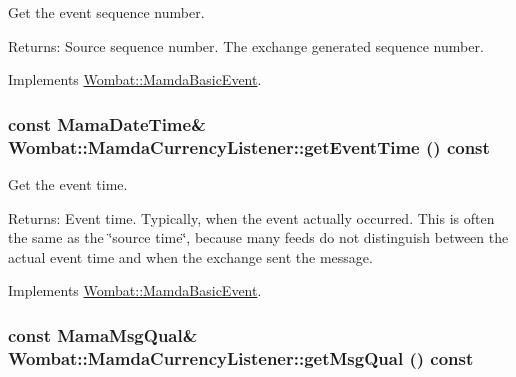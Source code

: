 Get the event sequence number. 

\begin{Desc}
\item[Returns:]Source sequence number. The exchange generated sequence number. \end{Desc}


Implements \hyperlink{classWombat_1_1MamdaBasicEvent_1fd845d48e95b4ee3beafc72d1ac2adf}{Wombat::Mamda\-Basic\-Event}.\hypertarget{classWombat_1_1MamdaCurrencyListener_f50eaef7c50bd1b1e58f0d38967d2b1c}{
\subsubsection[getEventTime]{\setlength{\rightskip}{0pt plus 5cm}const Mama\-Date\-Time\& Wombat::Mamda\-Currency\-Listener::get\-Event\-Time () const}}
\label{classWombat_1_1MamdaCurrencyListener_f50eaef7c50bd1b1e58f0d38967d2b1c}


Get the event time. 

\begin{Desc}
\item[Returns:]Event time. Typically, when the event actually occurred. This is often the same as the \char`\"{}source time\char`\"{}, because many feeds do not distinguish between the actual event time and when the exchange sent the message. \end{Desc}


Implements \hyperlink{classWombat_1_1MamdaBasicEvent_7285491c2c657207a64b1b0449c0339b}{Wombat::Mamda\-Basic\-Event}.\hypertarget{classWombat_1_1MamdaCurrencyListener_e130dc6327ffac134a0302293c4956e9}{
\subsubsection[getMsgQual]{\setlength{\rightskip}{0pt plus 5cm}const Mama\-Msg\-Qual\& Wombat::Mamda\-Currency\-Listener::get\-Msg\-Qual () const}}
\label{classWombat_1_1MamdaCurrencyListener_e130dc6327ffac134a0302293c4956e9}


